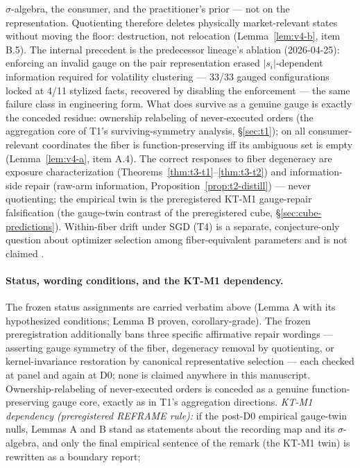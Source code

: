 $\sigma$-algebra, the consumer, and the practitioner's prior --- not on the
representation. Quotienting therefore deletes physically market-relevant
states without moving the floor: destruction, not relocation
(Lemma~\ref{lem:v4-b}, item B.5). The internal precedent is the
predecessor lineage's  ablation (2026-04-25): enforcing
an invalid gauge on the pair representation erased $|s_i|$-dependent
information required for volatility clustering --- 33/33 gauged
configurations locked at 4/11 stylized facts, recovered by disabling the
enforcement --- the same failure class in engineering form. What does
survive as a genuine gauge is exactly the conceded residue: ownership
relabeling of never-executed orders (the aggregation core of T1's
surviving-symmetry analysis, \S\ref{sec:t1}); on all consumer-relevant
coordinates the fiber is function-preserving iff its ambiguous set is empty
(Lemma~\ref{lem:v4-a}, item A.4). The correct responses to fiber degeneracy
are exposure characterization (Theorems~\ref{thm:t3-t1}--\ref{thm:t3-t2})
and information-side repair (raw-arm information,
Proposition~\ref{prop:t2-distill}) --- never quotienting; the empirical twin
is the preregistered KT-M1 gauge-repair falsification (the gauge-twin
contrast of the preregistered cube, \S\ref{sec:cube-predictions}).
Within-fiber drift
under SGD (T4) is a separate, conjecture-only question about optimizer
selection among fiber-equivalent parameters and is not claimed
\citep{soudry2017, lossbasis2026}.

\paragraph{Status, wording conditions, and the KT-M1 dependency.} The
frozen status assignments are carried verbatim above (Lemma A with its
hypothesized conditions; Lemma B proven, corollary-grade). The frozen
preregistration additionally bans three specific affirmative repair
wordings --- asserting gauge symmetry of the fiber, degeneracy removal by
quotienting, or kernel-invariance restoration by canonical representative
selection --- each checked at panel and again at D0; none is claimed
anywhere in this manuscript. Ownership-relabeling of never-executed orders
is conceded as a genuine function-preserving gauge core, exactly as in T1's
aggregation directions. \emph{KT-M1 dependency (preregistered REFRAME
rule):} if the post-D0 empirical gauge-twin nulls, Lemmas A and B stand as
statements about the recording map and its $\sigma$-algebra, and only the
final empirical sentence of the remark (the KT-M1 twin) is rewritten as a
boundary report; \RESULTSPENDING{}
